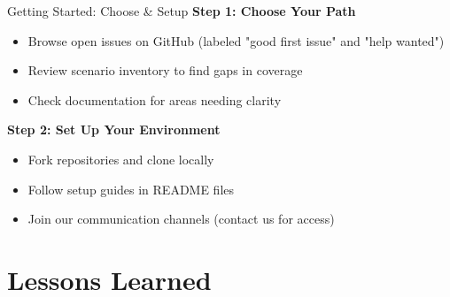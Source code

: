\documentclass[aspectratio=169]{beamer}
\begin{document}
\begin{frame}[squeeze]{Getting Started: Choose \& Setup}
  \textbf{Step 1: Choose Your Path}
  \begin{itemize}
    \item Browse open issues on GitHub (labeled "good first issue" and "help wanted")
    \item Review scenario inventory to find gaps in coverage
    \item Check documentation for areas needing clarity
  \end{itemize}
  
  \textbf{Step 2: Set Up Your Environment}
  \begin{itemize}
    \item Fork repositories and clone locally
    \item Follow setup guides in README files
    \item Join our communication channels (contact us for access)
  \end{itemize}
\end{frame}

\begin {comment}
\begin{frame}{Getting Started: Contribute \& Engage}
  \textbf{Step 3: Submit Your Contribution}
  \begin{itemize}
    \item Create pull request with clear description
    \item Ensure tests pass (where CI exists)
    \item Engage with code review feedback
  \end{itemize}
  
  \textbf{What to Expect}
  \begin{itemize}
    \item Friendly, constructive code reviews
    \item Response within 3-5 business days
    \item Recognition in contributors list and release notes
  \end{itemize}
  \note[item]{Final step plus expectations to encourage new contributors.}
\end{frame}
\end{comment}

\section{Lessons Learned}
\end{document}

